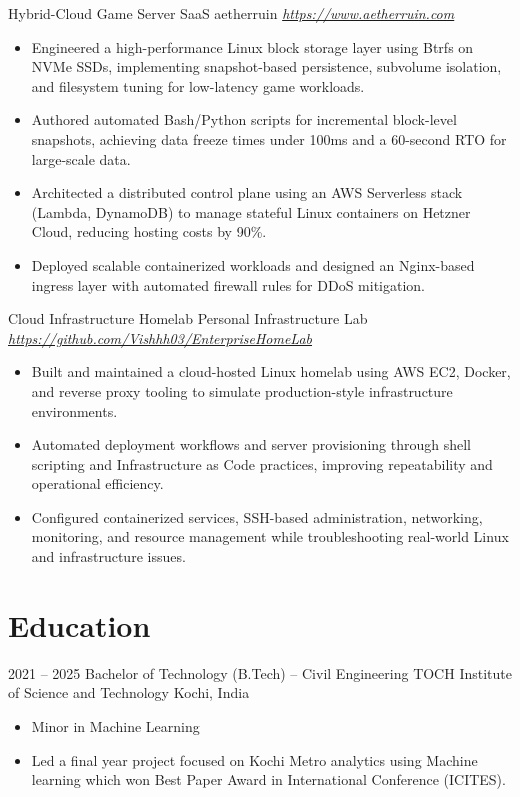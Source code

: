 \documentclass[10pt, a4paper, sans]{moderncv}
\begin{document}
\cventry
  {}
  {Hybrid-Cloud Game Server SaaS}
  {aetherruin}
  {\textit{\url{https://www.aetherruin.com}}}
  {}
  {
  \begin{itemize}\setlength{\itemsep}{2pt}
    \item Engineered a high-performance Linux block storage layer using Btrfs on NVMe SSDs, implementing snapshot-based persistence, subvolume isolation, and filesystem tuning for low-latency game workloads.
    \item Authored automated Bash/Python scripts for incremental block-level snapshots, achieving data freeze times under 100ms and a 60-second RTO for large-scale data.
    \item Architected a distributed control plane using an AWS Serverless stack (Lambda, DynamoDB) to manage stateful Linux containers on Hetzner Cloud, reducing hosting costs by 90\%.
    \item Deployed scalable containerized workloads and designed an Nginx-based ingress layer with automated firewall rules for DDoS mitigation.
  \end{itemize}
  }

\vspace{1mm}

\cventry
  {}
  {Cloud Infrastructure Homelab}
  {Personal Infrastructure Lab}
  {\textit{\url{https://github.com/Vishhh03/EnterpriseHomeLab}}}
  {}
  {
  \begin{itemize}\setlength{\itemsep}{2pt}
    \item Built and maintained a cloud-hosted Linux homelab using AWS EC2, Docker, and reverse proxy tooling to simulate production-style infrastructure environments.
    \item Automated deployment workflows and server provisioning through shell scripting and Infrastructure as Code practices, improving repeatability and operational efficiency.
    \item Configured containerized services, SSH-based administration, networking, monitoring, and resource management while troubleshooting real-world Linux and infrastructure issues.
  \end{itemize}
  }

\section{Education}

\cventry
  {2021 -- 2025}
  {Bachelor of Technology (B.Tech) -- Civil Engineering}
  {TOCH Institute of Science and Technology}
  {Kochi, India}
  {}
  {
  \begin{itemize}\setlength{\itemsep}{2pt}
    \item Minor in Machine Learning
    \item Led a final year project focused on Kochi Metro analytics using Machine learning which won Best Paper Award in International Conference (ICITES).
  \end{itemize}
  }
\end{document}
